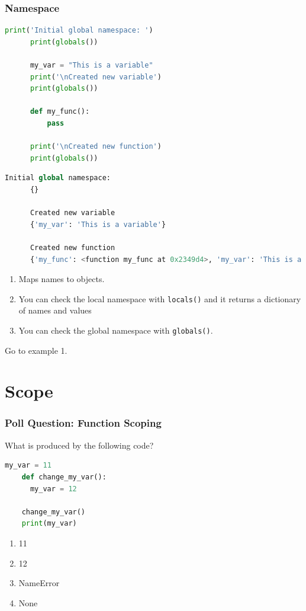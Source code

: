 \documentclass{beamer}
\begin{document}
%
%
\begin{frame}[fragile]
  \frametitle{Namespace}
  \begin{minipage}{0.49\textwidth}
    \begin{lstlisting}[language=Python, autogobble, basicstyle=\tiny]
      print('Initial global namespace: ')
      print(globals())

      my_var = "This is a variable"
      print('\nCreated new variable')
      print(globals())

      def my_func():
          pass

      print('\nCreated new function')
      print(globals())
    \end{lstlisting}
  \end{minipage}
  \begin{minipage}{0.49\textwidth}
    \begin{lstlisting}[language=Python, autogobble, basicstyle=\tiny]
      Initial global namespace: 
      {}

      Created new variable
      {'my_var': 'This is a variable'}

      Created new function
      {'my_func': <function my_func at 0x2349d4>, 'my_var': 'This is a variable'}
    \end{lstlisting}
  \end{minipage}
  \vfill
  \begin{enumerate}
    \item Maps names to objects.
    \pause
    \item You can check the local namespace with \lstinline|locals()| and it returns a dictionary of names and values
    \pause
    \item You can check the global namespace with \lstinline|globals()|.
  \end{enumerate}
  \pause
  \vfill
  Go to example 1.
\end{frame}

\section{Scope}

%
%
%
\begin{frame}[fragile]
  \frametitle{Poll Question: Function Scoping}
  \begin{minipage}{0.69\textwidth}
    What is produced by the following code?
    \begin{lstlisting}[language=Python, autogobble]
    my_var = 11
    def change_my_var():
      my_var = 12

    change_my_var()
    print(my_var)
    \end{lstlisting}
  \end{minipage}
  \hfill
  \begin{minipage}{0.29\textwidth}
    \begin{enumerate}[A]
      \item 11
      \item 12
      \item NameError
      \item None
    \end{enumerate}
  \end{minipage}
\end{frame}
\end{document}
